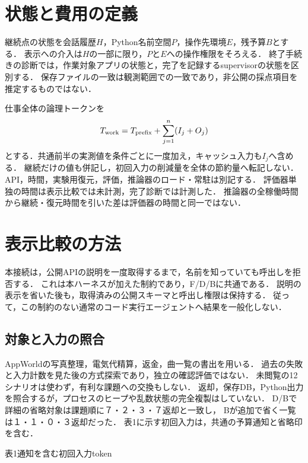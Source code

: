 \documentclass[uplatex,a4paper,twocolumn,10pt]{jsarticle}
\begin{document}
\section{状態と費用の定義}
継続点の状態を会話履歴$H$，Python名前空間$P$，操作先環境$E$，残予算$B$とする．
表示への介入は$H$の一部に限り，$P$と$E$への操作権限をそろえる．
終了手続きの診断では，作業対象アプリの状態と，完了を記録するsupervisorの状態を区別する．
保存ファイルの一致は観測範囲での一致であり，非公開の採点項目を推定するものではない．

仕事全体の論理トークンを
\begin{equation}
 T_{\rm work}=T_{\rm prefix}+\sum_{j=1}^{n}(I_j+O_j)
\end{equation}
とする．共通前半の実測値を条件ごとに一度加え，キャッシュ入力も$I_j$へ含める．
継続だけの値も併記し，初回入力の削減量を全体の節約量へ転記しない．
API，時間，実験用復元，評価，推論器のロード・常駐は別記する．
評価器単独の時間は表示比較では未計測，完了診断では計測した．
推論器の全稼働時間から継続・復元時間を引いた差は評価器の時間と同一ではない．

\section{表示比較の方法}


本接続は，公開APIの説明を一度取得するまで，名前を知っていても呼出しを拒否する．
これは本ハーネスが加えた制約であり，F/D/Bに共通である．
説明の表示を省いた後も，取得済みの公開スキーマと呼出し権限は保持する．
従って，この制約のない通常のコード実行エージェントへ結果を一般化しない．

\subsection{対象と入力の照合}
AppWorld\cite{appworld}の写真整理，電気代精算，返金，曲一覧の書出を用いる．
過去の失敗と入力計数を見た後の方式探索であり，独立の確認評価ではない．
未閲覧の12シナリオは使わず，有利な課題への交換もしない．
返却，保存DB，Python出力を照合するが，プロセスのヒープや乱数状態の完全複製はしていない．
D/Bで詳細の省略対象は課題順に７・２・３・７返却と一致し，
Bが追加で省く一覧は１・１・０・３返却だった．
表1に示す初回入力は，共通の予算通知と省略印を含む．

\begin{center}\begin{minipage}{\columnwidth}\centering
\small 表1\quad 通知を含む初回入力token\par\smallskip
\InventoryFirstInputs
\end{minipage}\end{center}
\end{document}
